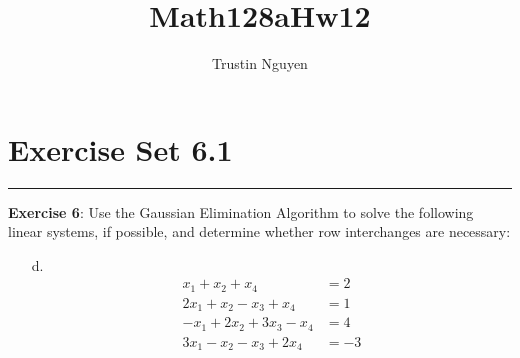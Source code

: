 \documentclass{article}
\title{Math128aHw12}
\author{Trustin Nguyen}
\begin{document}
    \maketitle

\reversemarginpar

\section*{Exercise Set 6.1}
\hrule

\textbf{Exercise 6}: Use the Gaussian Elimination Algorithm to solve the following linear systems, if possible, and determine whether row interchanges are necessary:
    \begin{itemize}
        \item [d.] 
            \begin{align*}
                x_{1} + x_{2} + x_{4}            &= 2  \\
                2x_{1} + x_{2} - x_{3} + x_{4}   &= 1  \\
                -x_{1} + 2x_{2} + 3x_{3} - x_{4} &= 4  \\
                3x_{1} - x_{2} - x_{3} + 2x_{4}  &= -3   
            \end{align*}
    \end{itemize}
\end{document}
